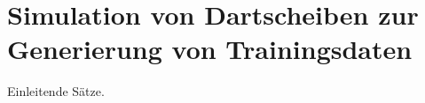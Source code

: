 
\chapter{Simulation von Dartscheiben zur Generierung von Trainingsdaten}
\label{cha:daten}

Einleitende Sätze.





